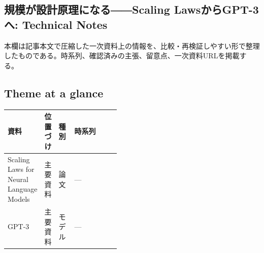 \subsection*{規模が設計原理になる――Scaling LawsからGPT-3へ: Technical Notes}
本欄は記事本文で圧縮した一次資料上の情報を、比較・再検証しやすい形で整理したものである。時系列、確認済みの主張、留意点、一次資料URLを掲載する。
\smallskip
{}\par
\medskip
\subsection*{Theme at a glance}
\begin{center}
\footnotesize
\begin{tabularx}{\linewidth}{@{}p{0.20\linewidth}p{0.10\linewidth}p{0.14\linewidth}X@{}}
\toprule
資料 & 位置づけ & 種別 & 時系列 \\
\midrule
Scaling Laws for Neural Language Models & 主要資料 & 論文 & — \\
GPT-3 & 主要資料 & モデル & — \\
\bottomrule
\end{tabularx}
\end{center}
\normalsize

